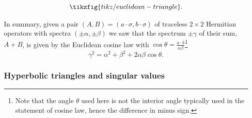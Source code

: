 \documentclass[notitlepage]{article}
\begin{document}
\begin{equation}
    \tikzfig{tikz/euclidean-triangle}.
\end{equation}

In summary, given a pair $(A,B) = (a\cdot \sigma, b\cdot \sigma)$ of traceless $2\times 2$ Hermitian operators with spectra $(\pm \alpha, \pm \beta)$ we saw that the spectrum $\pm \gamma$ of their sum, $A+B$, is given by the Euclidean cosine law with $\cos \theta = \frac{a \cdot b}{\alpha \beta}$\footnote{Note that the angle $\theta$ used here is not the interior angle typically used in the statement of cosine law, hence the difference in minus sign.}
\begin{equation}
    \gamma^2 = \alpha^2 + \beta^2 + 2 \alpha \beta \cos \theta.
\end{equation}

\subsubsection{Hyperbolic triangles and singular values}
\end{document}
